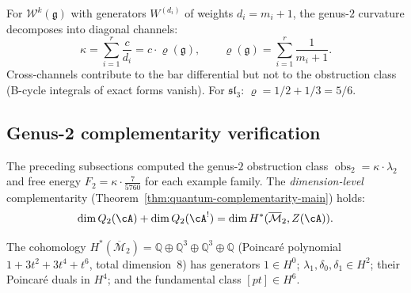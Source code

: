 \begin{remark}
\label{rem:w3-genus2-channels}
For $\mathcal{W}^k(\mathfrak{g})$ with generators $W^{(d_i)}$ of weights $d_i = m_i + 1$, the genus-$2$ curvature decomposes into diagonal channels:
\begin{equation}\label{eq:w-genus2-channel-decomp}
\kappa = \sum_{i=1}^{r} \frac{c}{d_i}
= c \cdot \varrho(\mathfrak{g}), \qquad
\varrho(\mathfrak{g}) = \sum_{i=1}^{r} \frac{1}{m_i + 1}.
\end{equation}
Cross-channels contribute to the bar differential but not to the obstruction class (B-cycle integrals of exact forms vanish).  For $\mathfrak{sl}_3$: $\varrho = 1/2 + 1/3 = 5/6$.
\end{remark}

\subsection{Genus-2 complementarity verification}\label{subsec:genus2-complementarity-verification}

The preceding subsections computed the genus-$2$ obstruction class
$\operatorname{obs}_2 = \kappa \cdot \lambda_2$ and free energy
$F_2 = \kappa \cdot \frac{7}{5760}$ for each example family.
The \emph{dimension-level} complementarity
(Theorem~\ref{thm:quantum-complementarity-main}) holds:
\begin{equation}\label{eq:genus2-complementarity-dim}
\dim Q_2(\cA) + \dim Q_2(\cA^!) = \dim H^*(\overline{\mathcal{M}}_2,
Z(\cA)).
\end{equation}

The cohomology
$H^*(\overline{\mathcal{M}}_2) = \mathbb{Q} \oplus \mathbb{Q}^3
\oplus \mathbb{Q}^3 \oplus \mathbb{Q}$
(Poincar\'e polynomial $1 + 3t^2 + 3t^4 + t^6$, total dimension~$8$)
has generators $1 \in H^0$; $\lambda_1, \delta_0, \delta_1 \in H^2$;
their Poincar\'e duals in $H^4$; and the fundamental class $[pt] \in H^6$.

